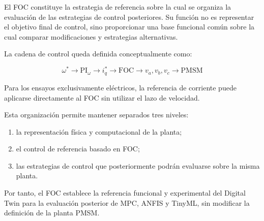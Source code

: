 El FOC constituye la estrategia de referencia sobre la cual se organiza la evaluación de las estrategias de control posteriores. Su función no es representar el objetivo final de control, sino proporcionar una base funcional común sobre la cual comparar modificaciones y estrategias alternativas.

La cadena de control queda definida conceptualmente como:

\begin{equation}
\omega^{*}
\rightarrow
\mathrm{PI}_{\omega}
\rightarrow
i_q^{*}
\rightarrow
\mathrm{FOC}
\rightarrow
{v_a,v_b,v_c}
\rightarrow
\mathrm{PMSM}
\end{equation}

Para los ensayos exclusivamente eléctricos, la referencia de corriente puede aplicarse directamente al FOC sin utilizar el lazo de velocidad.

Esta organización permite mantener separados tres niveles:

\begin{enumerate}
\item la representación física y computacional de la planta;
\item el control de referencia basado en FOC;
\item las estrategias de control que posteriormente podrán evaluarse sobre la misma planta.
\end{enumerate}

Por tanto, el FOC establece la referencia funcional y experimental del Digital Twin para la evaluación posterior de MPC, ANFIS y TinyML, sin modificar la definición de la planta PMSM.
